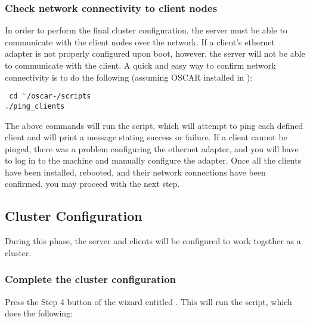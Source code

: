\subsubsection{Check network connectivity to client nodes}
\label{det:pingclients}

In order to perform the final cluster configuration, the server must
be able to communicate with the client nodes over the network. If a
client's ethernet adapter is not properly configured upon boot,
however, the server will not be able to communicate with the client. A
quick and easy way to confirm network connectivity is to do the
\begchange
following (assuming OSCAR installed in ):

\vspace{11pt}
{\tt
  cd $^\sim$/oscar-\oscarversion/scripts \\
\indent  ./ping\_clients
}
\vspace{11pt}

\endchange

The above commands will run the  script, which will
attempt to ping each defined client and will print a message stating
success or failure. If a client cannot be pinged, there was a problem
configuring the 
ethernet adapter, and you will have to log in to the machine and
manually configure the adapter. Once all the clients have been
installed, rebooted, and their network connections have been
confirmed, you may proceed with the next step.


\subsection{Cluster Configuration}

During this phase, the server and clients will be configured to work
together as a cluster.

\subsubsection{Complete the cluster configuration}
\label{det:completeinstall}

Press the Step 4 button of the wizard entitled .  This will run the  script,
which does the following:


